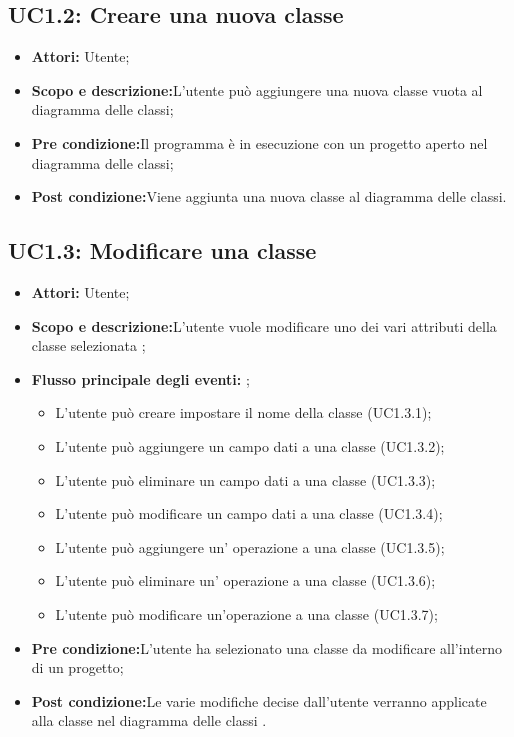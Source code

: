 \documentclass[../AnalisiDeiRequisiti.tex]{subfiles}
\begin{document}
	\subsection{UC1.2: Creare una nuova classe}
	\begin{itemize}
		\item \textbf{Attori:} Utente;
		\item \textbf{Scopo e descrizione:}L'utente può aggiungere una nuova classe vuota al diagramma delle classi;
		\item \textbf{Pre condizione:}Il programma è in esecuzione con un progetto aperto nel diagramma delle classi;
		\item \textbf{Post condizione:}Viene aggiunta una nuova classe al diagramma delle classi.
	\end{itemize}
	
	\subsection{UC1.3: Modificare una classe}
	\begin{itemize}
		\item \textbf{Attori:} Utente;
		\item \textbf{Scopo e descrizione:}L'utente vuole modificare uno dei vari attributi della classe selezionata ;
		\item \textbf{Flusso principale degli eventi: } ;
		\begin{itemize}
			\item L'utente può creare impostare il nome della classe (UC1.3.1);
			\item L'utente può aggiungere un campo dati a una classe (UC1.3.2);
			\item L'utente può eliminare un campo dati a una classe (UC1.3.3);
			\item L'utente può modificare un campo dati a una classe (UC1.3.4);
			\item L'utente può aggiungere un' operazione a una classe (UC1.3.5);
			\item L'utente può eliminare un' operazione a una classe (UC1.3.6);
			\item L'utente può modificare un'operazione a una classe (UC1.3.7);
		\end{itemize}
		\item \textbf{Pre condizione:}L'utente ha selezionato una classe da modificare all'interno di un progetto;
		\item \textbf{Post condizione:}Le varie modifiche decise dall'utente verranno applicate alla classe nel diagramma delle classi .
	\end{itemize}
	
\end{document}
